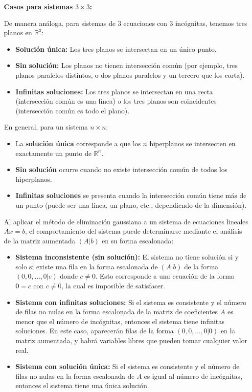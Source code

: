 \begin{rem}
\textbf{Casos para sistemas $3 \times 3$:}

De manera análoga, para sistemas de $3$ ecuaciones con $3$ incógnitas, tenemos tres planos en $\mathbb{R}^3$:

\begin{itemize}
    \item \textbf{Solución única:} Los tres planos se intersectan en un único punto.
    \item \textbf{Sin solución:} Los planos no tienen intersección común (por ejemplo, tres planos paralelos distintos, o dos planos paralelos y un tercero que los corta).
    \item \textbf{Infinitas soluciones:} Los tres planos se intersectan en una recta (intersección común es una línea) o los tres planos son coincidentes (intersección común es todo el plano).
\end{itemize}

En general, para un sistema $n \times n$:
\begin{itemize}
    \item La \textbf{solución única} corresponde a que los $n$ hiperplanos se intersecten en exactamente un punto de $\mathbb{R}^n$.
    \item \textbf{Sin solución} ocurre cuando no existe intersección común de todos los hiperplanos.
    \item \textbf{Infinitas soluciones} se presenta cuando la intersección común tiene más de un punto (puede ser una línea, un plano, etc., dependiendo de la dimensión).
\end{itemize}
\end{rem}
\begin{rem}
Al aplicar el método de eliminación gaussiana a un sistema de ecuaciones lineales $Ax = b$, el comportamiento del sistema puede determinarse mediante el análisis de la matriz aumentada $(A|b)$ en su forma escalonada:

\begin{itemize}
    \item \textbf{Sistema inconsistente (sin solución):} El sistema no tiene solución si y solo si existe una fila en la forma escalonada de $(A|b)$ de la forma $(0, 0, \ldots, 0 | c)$ donde $c \neq 0$. Esto corresponde a una ecuación de la forma $0 = c$ con $c \neq 0$, la cual es imposible de satisfacer.
    
    \item \textbf{Sistema con infinitas soluciones:} Si el sistema es consistente y el número de filas no nulas en la forma escalonada de la matriz de coeficientes $A$ es menor que el número de incógnitas, entonces el sistema tiene infinitas soluciones. En este caso, aparecerán filas de la forma $(0, 0, \ldots, 0 | 0)$ en la matriz aumentada, y habrá variables libres que pueden tomar cualquier valor real.
    
    \item \textbf{Sistema con solución única:} Si el sistema es consistente y el número de filas no nulas en la forma escalonada de $A$ es igual al número de incógnitas, entonces el sistema tiene una única solución.
\end{itemize}
\end{rem}


